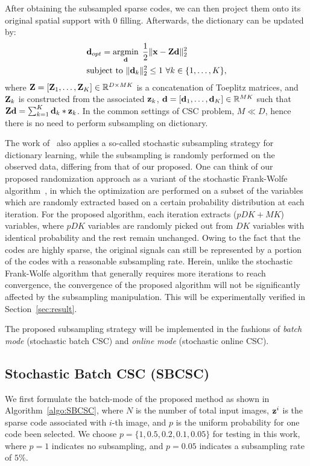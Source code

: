 After obtaining the subsampled sparse codes, we can then project them onto its original spatial support with $0$ filling. Afterwards, the dictionary can be updated by:
\begin{equation} \label{eq:updatingFilter}
\begin{split}
   & \filter_{opt} = \minimize{\filter} \frac{1}{2}\|\signal - \Code \filter \|_2^2 \\
   & \text{subject to}  ~ \|\filter_k\|^2_2 \leq 1 ~ \forall k \in \{1,\dots,K\},
\end{split}
\end{equation}
where $\Code= [\Code_1, \dots, \Code_K] \in \mathbb{R}^{D \times MK}$ is a concatenation of Toeplitz matrices, and $\Code_k$ is constructed from the associated $\code_k$, $\filter= [\filter_1,\dots,\filter_K] \in \mathbb{R}^{MK}$ such that $ \Code \filter = \sum_{k=1}^{K} \filter_k * \code_k$. In the common settings of CSC problem, $M \ll D$, hence there is no need to perform subsampling on dictionary.

The work of~\cite{mensch2016dictionary} also applies a so-called stochastic subsampling strategy for dictionary learning, while the subsampling is randomly performed on the observed data, differing from that of our proposed. One can think of our proposed randomization approach as a variant of the stochastic Frank-Wolfe algorithm~\cite{reddi2016stochastic,pmlr-v80-kerdreux18a}, in which the optimization are performed on a subset of the variables which are randomly extracted based on a certain probability distribution at each iteration. For the proposed algorithm, each iteration extracts ($pDK+MK$) variables, where $pDK$ variables are randomly picked out from $DK$ variables with identical probability and the rest remain unchanged. Owing to the fact that the codes are highly sparse, the original signals can still be represented by a portion of the codes with a reasonable subsampling rate. Herein, unlike the stochastic Frank-Wolfe algorithm that generally requires more iterations to reach convergence, the convergence of the proposed algorithm will not be significantly affected by the subsampling manipulation. This will be experimentally verified in Section~\ref{sec:result}.

The proposed subsampling strategy will be implemented in the fashions of {\em batch mode} (stochastic batch CSC) and {\em online mode} (stochastic online CSC).

\subsection{Stochastic Batch CSC (SBCSC)}
We first formulate the batch-mode of the proposed method as shown in Algorithm~\ref{algo:SBCSC}, where $N$ is the number of total input images, $\code^i$ is the sparse code associated with $i$-th image, and $p$ is the uniform probability for one code been selected. We choose $p=\{1, 0.5, 0.2, 0.1, 0.05\}$ for testing in this work, where $p=1$ indicates no subsampling, and $p=0.05$ indicates a subsampling rate of $5\%$. 

